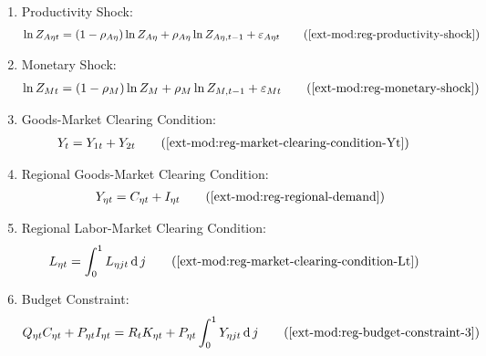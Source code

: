 \documentclass[../thesis.tex]{subfiles}
\begin{document}
{\begin{itemize}
\begin{enumerate}
		\begin{comment}
		\item National Price Level:
		\begin{align}
			P_{t} &= \frac{P_{1t} Y_{1t} + P_{2t} Y_{2t}}{Y_{t}} \tag{\ref{ext-mod:reg-national-price-level}} %
		\end{align}			
		\end{comment}
				
		\item Productivity Shock:
		\begin{align}
			\ln{Z_{A\eta t}} = (1-\rho_{A\eta})\ln{Z_{A\eta}} + \rho_{A\eta}\ln{Z_{A\eta,t-1}} + \varepsilon_{A\eta t} \tag{\ref{ext-mod:reg-productivity-shock}}
		\end{align}
		
		\item Monetary Shock:
		\begin{align}
			\ln{Z_{Mt}} = (1-\rho_M)\ln{Z_{M}} + \rho_M\ln{Z_{M,t-1}} + \varepsilon_{Mt} \tag{\ref{ext-mod:reg-monetary-shock}}
		\end{align}

		\item Goods-Market Clearing Condition:
		\begin{align}
			Y_{t} &= Y_{1 t} + Y_{2 t} \tag{\ref{ext-mod:reg-market-clearing-condition-Yt}}
		\end{align}

		\item Regional Goods-Market Clearing Condition:
		\begin{align}
			Y_{\eta t} = C_{\eta t} + I_{\eta t} \tag{\ref{ext-mod:reg-regional-demand}}
		\end{align}
		
		\item Regional Labor-Market Clearing Condition:
		\begin{align}
			L_{\eta t} &= \int_{0}^{1} L_{\eta jt} \dif j \tag{\ref{ext-mod:reg-market-clearing-condition-Lt}}
		\end{align}

		\item Budget Constraint:
		\begin{align}
			Q_{\eta t} C_{\eta t} + P_{\eta t} I_{\eta t} = R_{t} K_{\eta t} + P_{\eta t} \int_{0}^{1} Y_{\eta jt} \dif j \tag{\ref{ext-mod:reg-budget-constraint-3}}
		\end{align}
						
		\end{enumerate}
		
	\end{itemize}
	
} %
\end{document}
